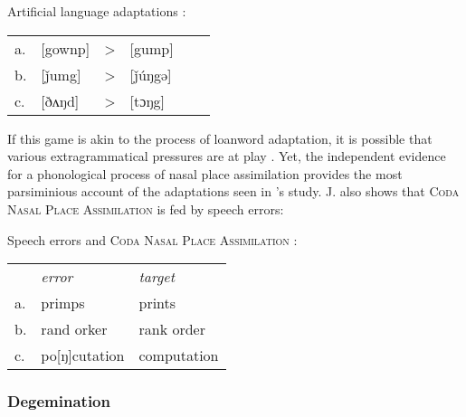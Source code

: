 \begin{example}
Artificial language adaptations \citep[][394, his transcriptions]{Wright1975}: 

\vspace{0.5\baselineskip}
\begin{tabular}{l l l l l l}
a. & [gownp] & > & [gump] \\
b. & [ǰumg]  & > & [ǰúŋgə] \\
c. & [ðʌŋd]  & > & [tɔŋg] \\
\end{tabular}
\end{example}

\noindent
If this game is akin to the process of loanword adaptation, it is possible that various extragrammatical pressures are at play \citep[e.g.,][]{Halle1998b,Dupoux1999,Ussishkin2003,Peperkamp2008}. Yet, the independent evidence for a phonological process of nasal place assimilation provides the most parsiminious account of the adaptations seen in \citeauthor{Wright1975}'s study. J. \citet{Myers1993} also shows that \textsc{Coda Nasal Place Assimilation} is fed by speech errors:

\begin{example} 
Speech errors and \textsc{Coda Nasal Place Assimilation} \citep[][228]{Myers1993}:

\vspace{0.5\baselineskip}
\begin{tabular}{l l l}
   & \emph{error}  & \emph{target} \\
a. & primps        & prints        \\
b. & rand orker    & rank order    \\
c. & po[ŋ]cutation & computation   \\
\end{tabular} 
\end{example}


\subsubsection{Degemination}

